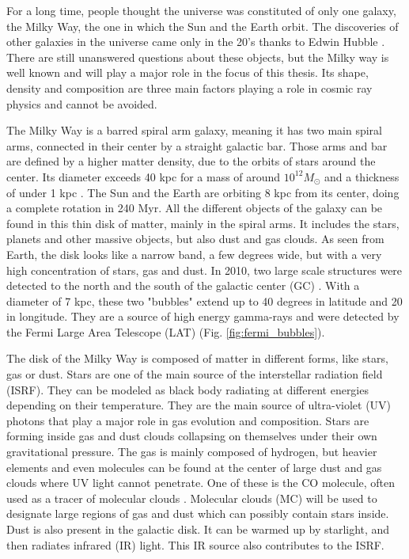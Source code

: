 For a long time, people thought the universe was constituted of only one galaxy, the Milky Way, the one in which the Sun and the Earth orbit. The discoveries of other galaxies in the universe came only in the 20's thanks to Edwin Hubble \cite{Hubble1925}. There are still unanswered questions about these objects, but the Milky way is well known and will play a major role in the focus of this thesis. Its shape, density and composition are three main factors playing a role in cosmic ray physics and cannot be avoided.

The Milky Way is a barred spiral arm galaxy, meaning it has two main spiral arms, connected in their center by a straight galactic bar. Those arms and bar are defined by a higher matter density, due to the orbits of stars around the center. Its diameter exceeds 40 kpc for a mass of around $10^{12} M_\odot$ and a thickness of under 1 kpc \cite{Kafle2014}. The Sun and the Earth are orbiting 8 kpc from its center, doing a complete rotation in 240 Myr.
All the different objects of the galaxy can be found in this thin disk of matter, mainly in the spiral arms. It includes the stars, planets and other massive objects, but also dust and gas clouds. As seen from Earth, the disk looks like a narrow band, a few degrees wide, but with a very high concentration of stars, gas and dust.
In 2010, two large scale structures were detected to the north and the south of the galactic center (GC) \cite{Slatyer2010} \cite{Ackermann2014}. With a diameter of 7 kpc, these two "bubbles" extend up to 40 degrees in latitude and 20 in longitude. They are a source of high energy gamma-rays and were detected by the Fermi Large Area Telescope (LAT) (Fig. \ref{fig:fermi_bubbles}).

The disk of the Milky Way is composed of matter in different forms, like stars, gas or dust. Stars are one of the main source of the interstellar radiation field (ISRF). They can be modeled as black body radiating at different energies depending on their temperature. They are the main source of ultra-violet (UV) photons that play a major role in gas evolution and composition. Stars are forming inside gas and dust clouds collapsing on themselves under their own gravitational pressure.
The gas is mainly composed of hydrogen, but heavier elements and even molecules can be found at the center of large dust and gas clouds where UV light cannot penetrate. One of these is the CO molecule, often used as a tracer of molecular clouds \cite{Planck2014} \cite{Liu2013}. Molecular clouds (MC) will be used to designate large regions of gas and dust which can possibly contain stars inside.
 Dust is also present in the galactic disk. It can be warmed up by starlight, and then radiates infrared (IR) light. This IR source also contributes to the ISRF.

